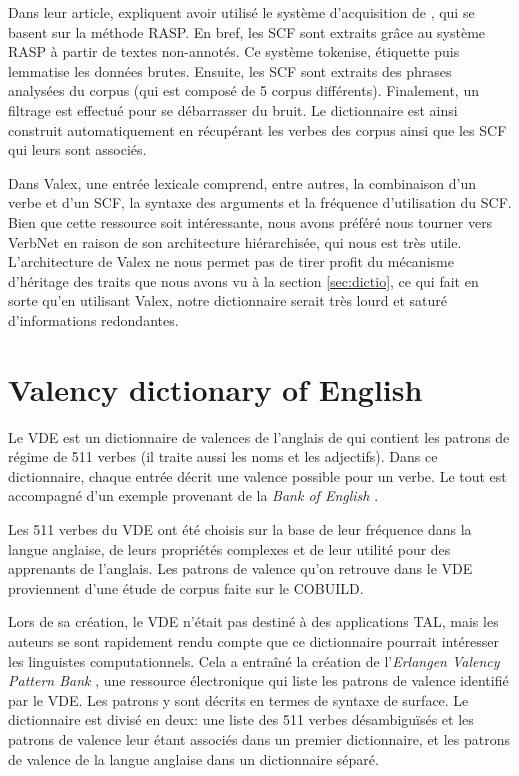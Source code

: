Dans leur article, \citeauthor{Korhonenlargesubcategorizationlexicon2006} expliquent avoir utilisé le système d'acquisition de \cite{BriscoeSecondReleaseRASP2006}, qui se basent sur la méthode RASP. En bref, les \ac{SCF} sont extraits grâce au système RASP à partir de textes non-annotés. Ce système tokenise, étiquette puis lemmatise les données brutes. Ensuite, les \ac{SCF} sont extraits des phrases analysées du corpus (qui est composé de 5 corpus différents). Finalement, un filtrage est effectué pour se débarrasser du bruit. Le dictionnaire est ainsi construit automatiquement en récupérant les verbes des corpus ainsi que les \ac{SCF} qui leurs sont associés.

Dans Valex, une entrée lexicale comprend, entre autres, la combinaison d'un verbe et d'un SCF, la syntaxe des arguments et la fréquence d'utilisation du SCF. Bien que cette ressource soit intéressante, nous avons préféré nous tourner vers VerbNet en raison de son architecture hiérarchisée, qui nous est très utile. L'architecture de Valex ne nous permet pas de tirer profit du mécanisme d'héritage des traits que nous avons vu à la section \ref{sec:dictio}, ce qui fait en sorte qu'en utilisant Valex, notre dictionnaire serait très lourd et saturé d'informations redondantes.

\section{Valency dictionary of English}
Le \acf{VDE} est un dictionnaire de valences de l'anglais de \cite{HerbstValencyDictionaryEnglish2004} qui contient les patrons de régime de 511 verbes (il traite aussi les noms et les adjectifs). Dans ce dictionnaire, chaque entrée décrit une valence possible pour un verbe. Le tout est accompagné d'un exemple provenant de la \emph{Bank of English} \citep{JarvinenAnnotating200Million1994}.

Les 511 verbes du VDE ont été choisis sur la base de leur fréquence dans la langue anglaise, de leurs propriétés complexes et de leur utilité pour des apprenants de l'anglais. Les patrons de valence qu'on retrouve dans le VDE proviennent d'une étude de corpus faite sur le COBUILD. 

Lors de sa création, le VDE n'était pas destiné à des applications TAL, mais les auteurs se sont rapidement rendu compte que ce dictionnaire pourrait intéresser les linguistes computationnels. Cela a entraîné la création de l'\emph{Erlangen Valency Pattern Bank} \citep{faucris.1039365}, une ressource électronique qui liste les patrons de valence identifié par le VDE. Les patrons y sont décrits en termes de syntaxe de surface. Le dictionnaire est divisé en deux: une liste des 511 verbes désambiguïsés et les patrons de valence leur étant associés dans un premier dictionnaire, et les patrons de valence de la langue anglaise dans un dictionnaire séparé.

